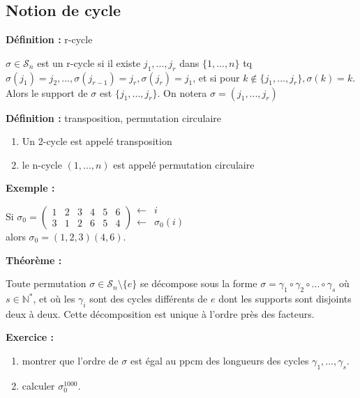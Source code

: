 \documentclass{report}
\newenvironment{definition}[1][]{
    \begin{tcolorbox}[colframe= white]
    \textbf{Définition :} 
    #1 \par
    }
    {\end{tcolorbox}}
\newenvironment{exemple}{\begin{tcolorbox}[colframe= white]
    \textbf{Exemple :}
     \par}
    {\end{tcolorbox}}
\newenvironment{exo}{\begin{tcolorbox}[colframe= white]
    \textbf{Exercice :}
    \par}
    {\end{tcolorbox}}
\newenvironment{theoreme}[1][]{
    \begin{tcolorbox}[]
    \textbf{Théorème :} #1  \par} 
    {\end{tcolorbox}}
\newcommand{\N}{\mathbb{N}}
\newcommand{\sn}{\mathcal{S}_{n}}
\newcommand{\unn}{\{1, ..., n\}}
\newcommand{\dsp}{\displaystyle}
\begin{document}
\subsection{Notion de cycle}
\begin{definition}[r-cycle]
$\sigma \in\sn$ est un r-cycle si il existe $j_1, ..., j_r$ dans $\unn$ tq $\sigma(j_1)=j_2, ..., \sigma(j_{r-1})=j_r, \sigma(j_r)=j_1$, et si pour $k\notin\{j_1,...,j_r\}, \sigma(k)=k$.\\Alors le support de $\sigma$ est $\{j_1,...,j_r\}$. On notera $\sigma = (j_1, ..., j_r)$
\end{definition}

\begin{definition}[transposition, permutation circulaire]
\begin{enumerate}
\item Un 2-cycle est appelé transposition
\item le n-cycle $(1, ..., n)$ est appelé permutation circulaire
\end{enumerate}
\end{definition}

\begin{exemple}
Si $\dsp\sigma_0=\left(\begin{array}{cccccc}
1&2&3&4&5&6\\3&1&2&6&5&4
\end{array}\right)
\begin{array}{cl}
\leftarrow&i\\\leftarrow&\sigma_0(i)
\end{array}$\\
alors $\sigma_0=(1,2,3)(4,6)$.
\end{exemple}

\begin{theoreme}
Toute permutation $\sigma\in\sn\setminus\{e\}$ se décompose sous la forme $\sigma=\gamma_1\circ\gamma_2\circ ... \circ\gamma_s$ où $s\in\N^*$, et où les $\gamma_i$ sont des cycles différents de $e$ dont les supports sont disjoints deux à deux. Cette décomposition est unique à l'ordre près des facteurs.
\end{theoreme}

\begin{exo}
\begin{enumerate}
\item montrer que l'ordre de $\sigma$ est égal au ppcm des longueurs des cycles $\gamma_1, ..., \gamma_s$.
\item calculer $\sigma_0^{1000}$.
\end{enumerate}
\end{exo}
\end{document}
